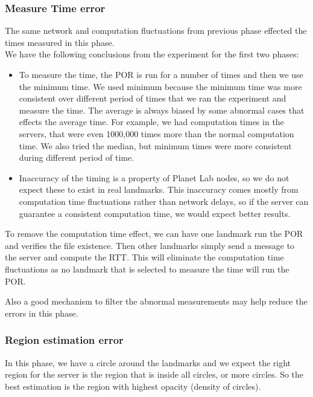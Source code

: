 \documentclass[12pt]{article}
\begin{document}
\subsubsection{Measure Time error}
The same network and computation fluctuations from previous phase effected 
the times measured in this phase. \\

We have the following conclusions from the experiment for the first two phases:
\begin{itemize}
\item To measure the time, the POR is run for a number of times and then 
we use the minimum time. We used minimum because the minimum time was more 
consistent over different period of times that we ran the experiment and measure the time. 
The average is always biased by some abnormal cases that effects the average time. For example, 
we had computation times in the servers, that were even 1000,000 times more than the normal 
computation time. We also tried the median, but minimum times were more consistent during different 
period of time.

\item Inaccuracy of the timing is a property of Planet Lab nodes, so 
we do not expect these to exist in real landmarks. This inaccuracy comes 
mostly from computation time fluctuations rather than network delays, so if 
the server can guarantee a consistent computation time, we would expect better results. 
\end{itemize}

 To remove the computation time effect, we can have one landmark run the 
POR and verifies the file existence. Then other landmarks simply send a message to the server 
and compute the RTT. This will eliminate the computation time fluctuations as 
no landmark that is selected to measure the time will run the POR. 

Also a good mechanism to filter the abnormal measurements may help reduce the errors in this phase.

\subsubsection{Region estimation error}
In this phase, we have a circle around the landmarks and we expect the right region for 
the server is the region that is inside all circles, or more circles. So the best estimation 
is the region with highest opacity (density of circles). 
\end{document}
